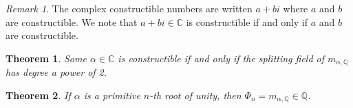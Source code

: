 \documentclass[
    parskip=half,
    toc=flat,
    toc=sectionentrydotfill,
]{scrartcl}  %
\theoremstyle{definition}
\theoremstyle{plain}
\newtheorem{theorem}{Theorem}[section]
\theoremstyle{remark}
\newtheorem{remark}{Remark}[section]
\newcommand{\C}{\mathbb{C}}
\newcommand{\Q}{\mathbb{Q}}
\begin{document}
\begin{remark}
    The complex constructible numbers are written $a+bi$ where $a$ and $b$ are constructible.
    We note that $a+bi\in\C$ is constructible if and only if $a$ and $b$ are constructible.
\end{remark}

\begin{theorem}
    Some $\alpha\in\C$ is constructible if and only if the splitting field of $m_{\alpha,\Q}$ has degree a power of 2.
\end{theorem}

\begin{theorem}
    If $\alpha$ is a primitive $n$-th root of unity, then $\Phi_n=m_{\alpha,\Q}\in\Q$.
\end{theorem}
\end{document}
